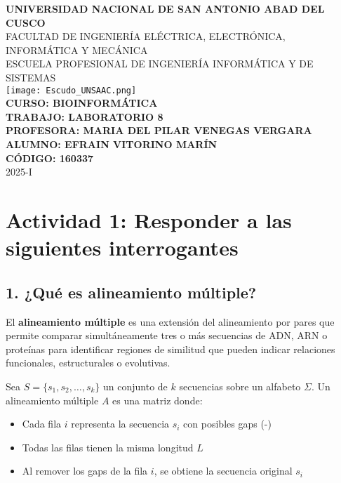 \documentclass[fleqn,10pt]{article}
\begin{document}
\begin{center}
    {\LARGE\bfseries UNIVERSIDAD NACIONAL DE SAN ANTONIO ABAD DEL CUSCO}\\[0.3cm]
    {\Large FACULTAD DE INGENIERÍA ELÉCTRICA, ELECTRÓNICA, INFORMÁTICA Y MECÁNICA}\\[0.3cm]
    {\Large ESCUELA PROFESIONAL DE INGENIERÍA INFORMÁTICA Y DE SISTEMAS}\\[1cm]
    \texttt{[image: Escudo\_UNSAAC.png]}\\[1cm]
    {\Large\bfseries CURSO: BIOINFORMÁTICA}\\[0.3cm]
    {\Large\bfseries TRABAJO: LABORATORIO 8 }\\[0.3cm]
    {\Large\bfseries PROFESORA: MARIA DEL PILAR VENEGAS VERGARA}\\[0.3cm]
    {\Large\bfseries ALUMNO: EFRAIN VITORINO MARÍN}\\[0.3cm]
    {\Large\bfseries CÓDIGO: 160337}\\[0.3cm]
    {\Large 2025-I}
\end{center}
\newpage

\section{Actividad 1: Responder a las siguientes interrogantes}

\subsection{1. ¿Qué es alineamiento múltiple?}

El \textbf{alineamiento múltiple} es una extensión del alineamiento por pares que permite comparar simultáneamente tres o más secuencias de ADN, ARN o proteínas para identificar regiones de similitud que pueden indicar relaciones funcionales, estructurales o evolutivas.

\begin{tcolorbox}[breakable, colback=blue!5!white,colframe=blue!75!black,title=Definición Formal]
Sea $S = \{s_1, s_2, \ldots, s_k\}$ un conjunto de $k$ secuencias sobre un alfabeto $\Sigma$. Un alineamiento múltiple $A$ es una matriz donde:
\begin{itemize}
    \item Cada fila $i$ representa la secuencia $s_i$ con posibles gaps (-)
    \item Todas las filas tienen la misma longitud $L$
    \item Al remover los gaps de la fila $i$, se obtiene la secuencia original $s_i$
\end{itemize}
\end{tcolorbox}
\end{document}
